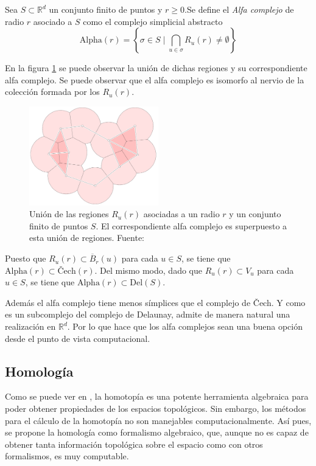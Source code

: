 \begin{definition}
Sea $S \subset \mathbb{R}^d$ un conjunto finito de puntos y $r \geq 0$.Se define el \emph{Alfa complejo} de radio $r$ asociado a $S$ como el complejo simplicial abstracto
\[
\text{Alpha}(r)=\left\{\sigma \in S \mid \bigcap_{u \in \sigma}R_u(r) \neq \emptyset \right\}
\]
\end{definition}

En la figura \ref{ref:alpha} se puede observar la unión de dichas regiones y su correspondiente alfa complejo. Se puede observar que el alfa complejo es isomorfo al nervio de la colección formada por los $R_u(r)$.

\begin{figure}[!ht]
\centering
\includegraphics[width=0.5\textwidth]{include/figuras/alpha.png} 
\caption{Unión de las regiones $R_u(r)$ asociadas a un radio $r$ y un conjunto finito de puntos $S$. El correspondiente alfa complejo es superpuesto a esta unión de regiones. Fuente: \cite{libroEH}}
\label{ref:alpha}
\end{figure}

Puesto que $R_u(r) \subset \overline{B}_r(u)$ para cada $u \in S$, se tiene que $\text{Alpha}(r) \subset \text{\v{C}ech}(r)$. Del mismo modo, dado que $R_u(r) \subset V_u$ para cada $u \in S$, se tiene que $\text{Alpha}(r) \subset \text{Del}(S)$.

Además el alfa complejo tiene menos símplices que el complejo de \v{C}ech. Y como es un subcomplejo del complejo de Delaunay, admite de manera natural una realización en $\mathbb{R}^d$. Por lo que hace que los alfa complejos sean una buena opción desde el punto de vista computacional.


\subsection{Homología}
Como se puede ver en \cite{Hatcher}, la homotopía es una potente herramienta algebraica para poder obtener propiedades de los espacios topológicos. Sin embargo, los métodos para el cálculo de la homotopía no son manejables computacionalmente. Así pues, se propone la homología como formalismo algebraico, que, aunque no es capaz de obtener tanta información topológica sobre el espacio como con otros formalismos, es muy computable.

